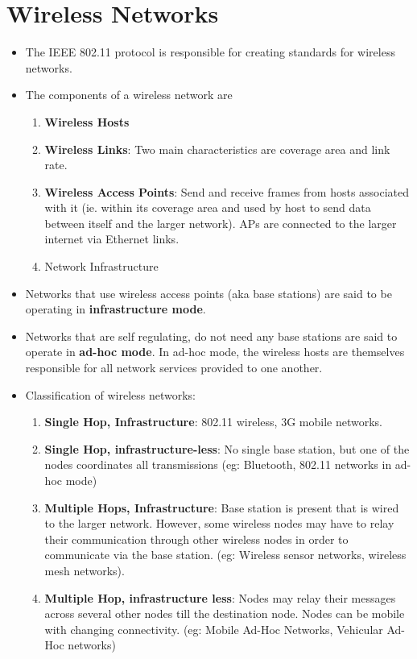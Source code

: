 \documentclass[a4paper]{article}
\theoremstyle{plain}
\theoremstyle{definition}
\begin{document}
\section{Wireless Networks}
\begin{itemize}
    \item The IEEE 802.11 protocol is responsible for creating standards for wireless networks. 
    
    \item The components of a wireless network are
    \begin{enumerate}
        \item \textbf{Wireless Hosts}
        
        \item \textbf{Wireless Links}: Two main characteristics are coverage area and link rate. 
        
        \item \textbf{Wireless Access Points}: Send and receive frames from hosts associated with it (ie. within its coverage area and used by host to send data between itself and the larger network). APs are connected to the larger internet via Ethernet links.
        
        \item Network Infrastructure
    \end{enumerate}
    
    \item Networks that use wireless access points (aka base stations) are said to be operating in \textbf{infrastructure mode}. 
    
    \item Networks that are self regulating, do not need any base stations are said to operate in \textbf{ad-hoc mode}. In ad-hoc mode, the wireless hosts are themselves responsible for all network services provided to one another. 
    
    \item Classification of wireless networks:
    \begin{enumerate}
        \item \textbf{Single Hop, Infrastructure}: 802.11 wireless, 3G mobile networks. 
        
        \item \textbf{Single Hop, infrastructure-less}: No single base station, but one of the nodes coordinates all transmissions (eg: Bluetooth,  802.11 networks in ad-hoc mode)
        
        \item \textbf{Multiple Hops, Infrastructure}: Base station is present that is wired to the larger network. However, some wireless nodes may have to relay their communication through other wireless nodes in order to communicate via the base station. (eg: Wireless sensor networks, wireless mesh networks). 
        
        \item\textbf{Multiple Hop, infrastructure less}: Nodes may relay their messages across several other nodes till the destination node. Nodes can be mobile with changing connectivity. (eg: Mobile Ad-Hoc Networks, Vehicular Ad-Hoc networks)
    \end{enumerate}
\end{itemize}
\end{document}
